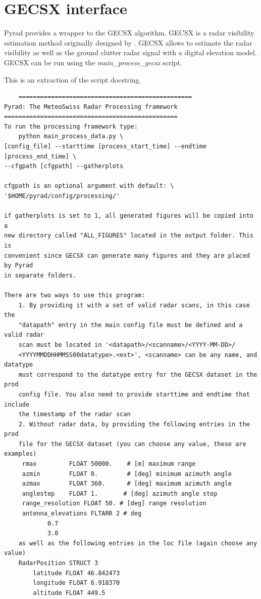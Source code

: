 \documentclass[a4paper,11pt,pdftex,twoside]{scrartcl}
\begin{document}
{{{\newpage

\section{GECSX interface}

Pyrad provides a wrapper to the GECSX algorithm. GECSX is a radar visibility estimation method originally designed by \citep{Gabella_JAOT_1998}.
GECSX allows to estimate the radar visibility as well as the ground clutter radar signal with a digital elevation model. GECSX can be run using the \textit{main\_process\_gecsx} script.

This is an extraction of the script docstring.
\begin{verbatim}
    ================================================
Pyrad: The MeteoSwiss Radar Processing framework
================================================
To run the processing framework type:
    python main_process_data.py \
[config_file] --starttime [process_start_time] --endtime [process_end_time] \
--cfgpath [cfgpath] --gatherplots

cfgpath is an optional argument with default: \
'$HOME/pyrad/config/processing/'

if gatherplots is set to 1, all generated figures will be copied into a
new directory called "ALL_FIGURES" located in the output folder. This is
convenient since GECSX can generate many figures and they are placed by Pyrad
in separate folders.

There are two ways to use this program:
    1. By providing it with a set of valid radar scans, in this case the
    "datapath" entry in the main config file must be defined and a valid radar
    scan must be located in '<datapath>/<scanname>/<YYYY-MM-DD>/
    <YYYYMMDDHHMMSS00datatype>.<ext>', <scanname> can be any name, and datatype
    must correspond to the datatype entry for the GECSX dataset in the prod
    config file. You also need to provide starttime and endtime that include
    the timestamp of the radar scan
    2. Without radar data, by providing the following entries in the prod
    file for the GECSX dataset (you can choose any value, these are examples)
     rmax         FLOAT 50000.    # [m] maximum range
     azmin        FLOAT 0.        # [deg] minimum azimuth angle
     azmax        FLOAT 360.      # [deg] maximum azimuth angle
     anglestep    FLOAT 1.       # [deg] azimuth angle step
     range_resolution FLOAT 50. # [deg] range resolution
     antenna_elevations FLTARR 2 # deg
            0.7
            3.0
    as well as the following entries in the loc file (again choose any value)
    RadarPosition STRUCT 3
        latitude FLOAT 46.842473
        longitude FLOAT 6.918370
        altitude FLOAT 449.5


\end{verbatim}}}}
\end{document}
